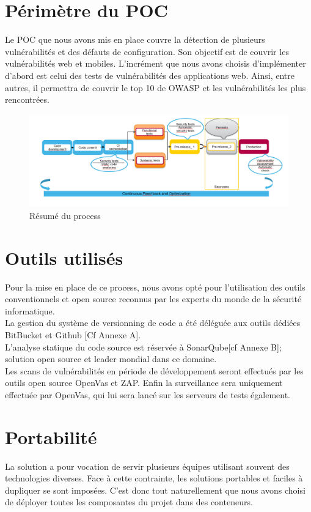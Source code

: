 \documentclass[a4paper,12pt]{book}
\theoremstyle{break}
\begin{document}
\section{Périmètre du POC}
Le POC que nous avons mis en place couvre la détection de plusieurs vulnérabilités et des défauts de configuration. 
Son objectif est de couvrir les vulnérabilités web et mobiles. L'incrément que nous avons choisis d'implémenter d'abord est celui des tests de vulnérabilités des applications web. 
Ainsi, entre autres, il permettra de couvrir le top 10 de \ac{OWASP} et les vulnérabilités les plus rencontrées.  

\begin{figure}[h!]
    \centering
    \includegraphics[width=1.17\textwidth]{process}
    \caption{Résumé du process}
    \label{fig:process}
\end{figure}
\section{Outils utilisés}
Pour la mise en place de ce process, nous avons opté pour l'utilisation des outils conventionnels et open source reconnus par les experts du monde de la sécurité informatique. 
\\La gestion du système de versionning de code a été déléguée aux outils dédiées BitBucket et Github [Cf Annexe A]. \\
L'analyse statique du code source est réservée à SonarQube[cf Annexe B]; solution open source et leader mondial dans ce domaine. 
\\Les scans de vulnérabilités en période de développement seront effectués par les outils open source OpenVas et ZAP. 
Enfin la surveillance sera uniquement effectuée par OpenVas, qui lui sera lancé sur les serveurs de tests également. 

\section{Portabilité}
La solution a pour vocation de servir plusieurs équipes utilisant souvent des technologies diverses. Face à cette contrainte, les solutions portables et faciles à dupliquer se sont imposées. C’est donc tout naturellement que nous avons choisi de déployer toutes les composantes du projet dans des conteneurs. 
\end{document}
